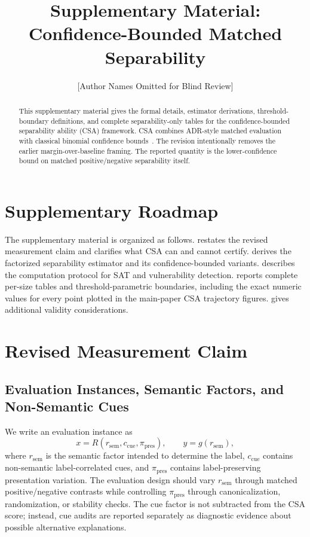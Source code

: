 \documentclass[10pt,conference]{IEEEtran}
\title{%
  \textbf{Supplementary Material:}\\
  Confidence-Bounded Matched Separability
}
\author{
  [Author Names Omitted for Blind Review]
}
\date{}
\theoremstyle{remark}
\newcommand{\reasonFac}{r_{\mathrm{sem}}}
\newcommand{\cueFac}{c_{\mathrm{cue}}}
\newcommand{\presentationFac}{\pi_{\mathrm{pres}}}
\begin{document}
\maketitle

\begin{abstract}
This supplementary material gives the formal details, estimator derivations, threshold-boundary definitions, and complete separability-only tables for the confidence-bounded separability ability (CSA) framework.  CSA combines ADR-style matched evaluation~\cite{zhang2026satisfiabilityADR} with classical binomial confidence bounds~\cite{clopper1934use,wilson1927probable,brown2001interval}.  The revision intentionally removes the earlier margin-over-baseline framing.  The reported quantity is the lower-confidence bound on matched positive/negative separability itself.
\end{abstract}

\section{Supplementary Roadmap}

The supplementary material is organized as follows.   restates the revised measurement claim and clarifies what CSA can and cannot certify.   derives the factorized separability estimator and its confidence-bounded variants.   describes the computation protocol for SAT and vulnerability detection.   reports complete per-size tables and threshold-parametric boundaries, including the exact numeric values for every point plotted in the main-paper CSA trajectory figures.   gives additional validity considerations.

\section{Revised Measurement Claim}
\label{sec:supp-claim}

\subsection{Evaluation Instances, Semantic Factors, and Non-Semantic Cues}

We write an evaluation instance as
\[
x=R(\reasonFac,\cueFac,\presentationFac),\qquad y=g(\reasonFac),
\]
where $\reasonFac$ is the semantic factor intended to determine the label, $\cueFac$ contains non-semantic label-correlated cues, and $\presentationFac$ contains label-preserving presentation variation.  The evaluation design should vary $\reasonFac$ through matched positive/negative contrasts while controlling $\presentationFac$ through canonicalization, randomization, or stability checks.  The cue factor is not subtracted from the CSA score; instead, cue audits are reported separately as diagnostic evidence about possible alternative explanations.
\end{document}
